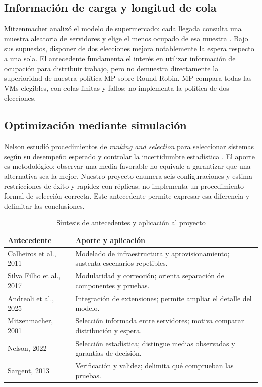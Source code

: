 \documentclass[conference,a4paper]{IEEEtran}
\begin{document}
\subsection{Información de carga y longitud de cola}
Mitzenmacher analizó el modelo de supermercado: cada llegada consulta una muestra aleatoria de servidores y elige el menos ocupado de esa muestra \cite{mitzenmacher}. Bajo sus supuestos, disponer de dos elecciones mejora notablemente la espera respecto a una sola. El antecedente fundamenta el interés en utilizar información de ocupación para distribuir trabajo, pero no demuestra directamente la superioridad de nuestra política MP sobre Round Robin. MP compara todas las VMs elegibles, con colas finitas y fallos; no implementa la política de dos elecciones.

\subsection{Optimización mediante simulación}
Nelson estudió procedimientos de \emph{ranking and selection} para seleccionar sistemas según su desempeño esperado y controlar la incertidumbre estadística \cite{nelson}. El aporte es metodológico: observar una media favorable no equivale a garantizar que una alternativa sea la mejor. Nuestro proyecto enumera seis configuraciones y estima restricciones de éxito y rapidez con réplicas; no implementa un procedimiento formal de selección correcta. Este antecedente permite expresar esa diferencia y delimitar las conclusiones.

\begin{table}[t]
\centering\footnotesize
\caption{Síntesis de antecedentes y aplicación al proyecto}
\label{tab:antecedentes}
\begin{tabularx}{\columnwidth}{@{}>{\raggedright\arraybackslash}p{}Y@{}}\toprule
\textbf{Antecedente} & \textbf{Aporte y aplicación}\\\midrule
Calheiros et al., 2011 \cite{cloudsim} & Modelado de infraestructura y aprovisionamiento; sustenta escenarios repetibles.\\
Silva Filho et al., 2017 \cite{plus} & Modularidad y corrección; orienta separación de componentes y pruebas.\\
Andreoli et al., 2025 \cite{seven} & Integración de extensiones; permite ampliar el detalle del modelo.\\
Mitzenmacher, 2001 \cite{mitzenmacher} & Selección informada entre servidores; motiva comparar distribución y espera.\\
Nelson, 2022 \cite{nelson} & Selección estadística; distingue medias observadas y garantías de decisión.\\
Sargent, 2013 \cite{sargent} & Verificación y validez; delimita qué comprueban las pruebas.\\\bottomrule
\end{tabularx}
\end{table}
\end{document}
